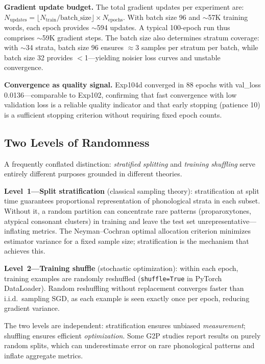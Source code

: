 \documentclass[conference]{IEEEtran}
\begin{document}
\textbf{Gradient update budget.}
The total gradient updates per experiment are:
$N_\mathrm{updates} = \lfloor N_\mathrm{train} / \mathrm{batch\_size}
\rfloor \times N_\mathrm{epochs}$.
With batch size 96 and $\sim$57K training words, each epoch provides
$\sim$594 updates.
A typical 100-epoch run thus comprises $\sim$59K gradient steps.
The batch size also determines stratum coverage: with
$\sim$34 strata, batch size 96 ensures $\approx$3 samples per
stratum per batch, while batch size 32 provides $<$1---yielding
noisier loss curves and unstable convergence.

\textbf{Convergence as quality signal.}
Exp104d converged in 88 epochs with val\_loss 0.0136---comparable to
Exp102, confirming that fast convergence with low validation loss is
a reliable quality indicator and that early stopping (patience 10) is
a sufficient stopping criterion without requiring fixed epoch counts.

\subsection{Two Levels of Randomness}

A frequently conflated distinction: \emph{stratified splitting} and
\emph{training shuffling} serve entirely different purposes grounded
in different theories.

\textbf{Level~1---Split stratification} (classical sampling theory):
stratification at split time guarantees proportional representation
of phonological strata in each subset.
Without it, a random partition can concentrate rare patterns
(proparoxytones, atypical consonant clusters) in training and leave
the test set unrepresentative---inflating metrics.
The Neyman--Cochran optimal allocation criterion minimizes estimator
variance for a fixed sample size; stratification is the mechanism
that achieves this.

\textbf{Level~2---Training shuffle} (stochastic optimization):
within each epoch, training examples are randomly reshuffled
(\texttt{shuffle=True} in PyTorch DataLoader).
Random reshuffling without replacement converges faster than
i.i.d.\ sampling SGD, as each example is seen exactly once per
epoch, reducing gradient variance.

The two levels are independent: stratification ensures unbiased
\emph{measurement}; shuffling ensures efficient \emph{optimization}.
Some G2P studies report results on purely random splits, which can
underestimate error on rare phonological patterns and inflate
aggregate metrics.
\end{document}
